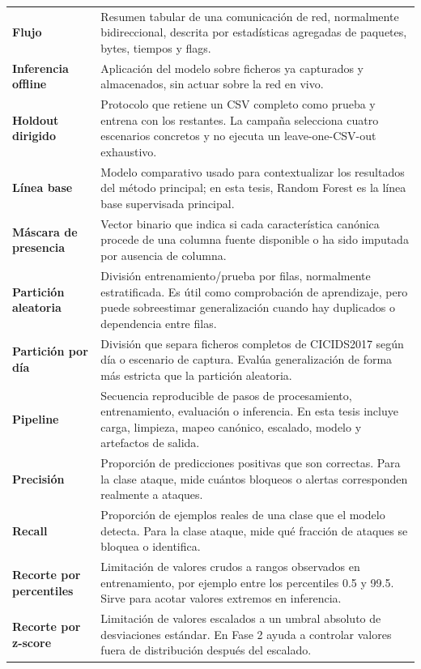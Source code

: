 \begin{longtable}{@{}p{3.8cm}p{9.6cm}@{}}
\textbf{Flujo} & Resumen tabular de una comunicación de red, normalmente bidireccional, descrita por estadísticas agregadas de paquetes, bytes, tiempos y flags. \\[2pt]
\textbf{Inferencia offline} & Aplicación del modelo sobre ficheros ya capturados y almacenados, sin actuar sobre la red en vivo. \\[2pt]
\textbf{Holdout dirigido} & Protocolo que retiene un CSV completo como prueba y entrena con los restantes. La campaña selecciona cuatro escenarios concretos y no ejecuta un leave-one-CSV-out exhaustivo. \\[2pt]
\textbf{Línea base} & Modelo comparativo usado para contextualizar los resultados del método principal; en esta tesis, Random Forest es la línea base supervisada principal. \\[2pt]
\textbf{Máscara de presencia} & Vector binario que indica si cada característica canónica procede de una columna fuente disponible o ha sido imputada por ausencia de columna. \\[2pt]
\textbf{Partición aleatoria} & División entrenamiento/prueba por filas, normalmente estratificada. Es útil como comprobación de aprendizaje, pero puede sobreestimar generalización cuando hay duplicados o dependencia entre filas. \\[2pt]
\textbf{Partición por día} & División que separa ficheros completos de CICIDS2017 según día o escenario de captura. Evalúa generalización de forma más estricta que la partición aleatoria. \\[2pt]
\textbf{Pipeline} & Secuencia reproducible de pasos de procesamiento, entrenamiento, evaluación o inferencia. En esta tesis incluye carga, limpieza, mapeo canónico, escalado, modelo y artefactos de salida. \\[2pt]
\textbf{Precisión} & Proporción de predicciones positivas que son correctas. Para la clase ataque, mide cuántos bloqueos o alertas corresponden realmente a ataques. \\[2pt]
\textbf{Recall} & Proporción de ejemplos reales de una clase que el modelo detecta. Para la clase ataque, mide qué fracción de ataques se bloquea o identifica. \\[2pt]
\textbf{Recorte por percentiles} & Limitación de valores crudos a rangos observados en entrenamiento, por ejemplo entre los percentiles 0.5 y 99.5. Sirve para acotar valores extremos en inferencia. \\[2pt]
\textbf{Recorte por z-score} & Limitación de valores escalados a un umbral absoluto de desviaciones estándar. En Fase 2 ayuda a controlar valores fuera de distribución después del escalado. \\[2pt]

\end{longtable}

